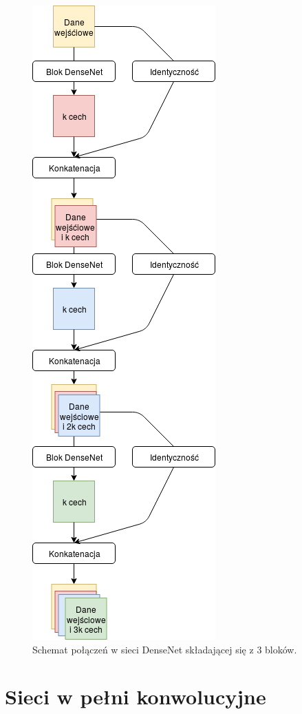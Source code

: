 \documentclass[a4paper,11pt,twoside]{report}
\theoremstyle{definition}
\begin{document}
\begin{figure}[h!]
	\centering
	\includegraphics[scale=0.7]{densenet}
	\caption{Schemat połączeń w sieci DenseNet składającej się z 3 bloków.}
\end{figure}

\section*{Sieci w pełni konwolucyjne}
\end{document}
